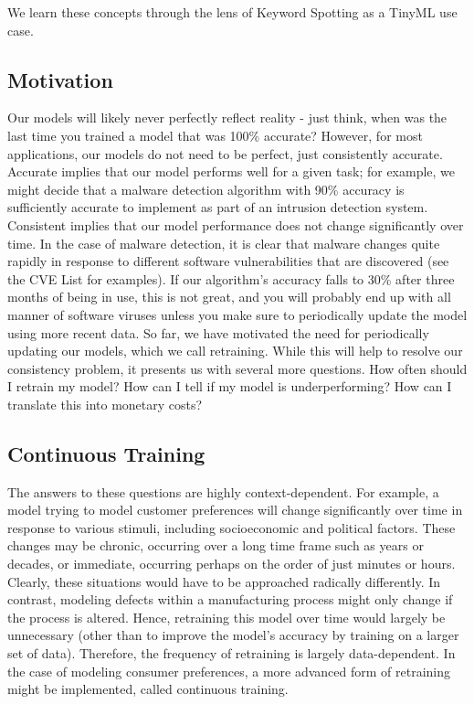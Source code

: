 {{{{  We learn these concepts through the lens of Keyword Spotting as a TinyML use case.
  
\subsection{Motivation}

  Our models will likely never perfectly reflect reality - just think, when was the last time you trained a model that was 100\% accurate? However, for most applications, our models do not need to be perfect, just consistently accurate. Accurate implies that our model performs well for a given task; for example, we might decide that a malware detection algorithm with 90\% accuracy is sufficiently accurate to implement as part of an intrusion detection system. Consistent implies that our model performance does not change significantly over time. In the case of malware detection, it is clear that malware changes quite rapidly in response to different software vulnerabilities that are discovered (see the CVE List for examples). If our algorithm’s accuracy falls to 30\% after three months of being in use, this is not great, and you will probably end up with all manner of software viruses unless you make sure to periodically update the model using more recent data. So far, we have motivated the need for periodically updating our models, which we call retraining. While this will help to resolve our consistency problem, it presents us with several more questions. How often should I retrain my model? How can I tell if my model is underperforming? How can I translate this into monetary costs?
  
  \subsection{Continuous Training}
  
  The answers to these questions are highly context-dependent. For example, a model trying to model customer preferences will change significantly over time in response to various stimuli, including socioeconomic and political factors. These changes may be chronic, occurring over a long time frame such as years or decades, or immediate, occurring perhaps on the order of just minutes or hours. Clearly, these situations would have to be approached radically differently. In contrast, modeling defects within a manufacturing process might only change if the process is altered. Hence, retraining this model over time would largely be unnecessary (other than to improve the model’s accuracy by training on a larger set of data). Therefore, the frequency of retraining is largely data-dependent. In the case of modeling consumer preferences, a more advanced form of retraining might be implemented, called continuous training. 
  
}}}}
